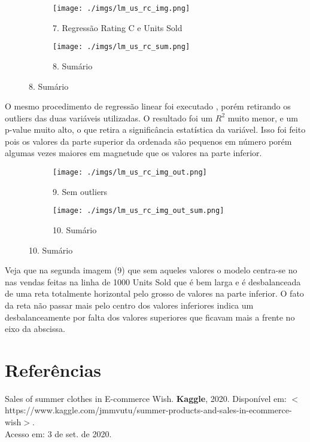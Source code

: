 \documentclass[12pt, a4paper]{article}
\begin{document}
\FloatBarrier
\begin{figure}[h]
	\hspace{1cm}
  \begin{subfigure}[b]{0.4\textwidth}
    \texttt{[image: ./imgs/lm\_us\_rc\_img.png]}
    \caption*{7. Regressão Rating C e Units Sold}
    \label{fig:1}
    \hspace{1.0cm}
  \end{subfigure}
  \begin{subfigure}[b]{0.5\textwidth}
    \texttt{[image: ./imgs/lm\_us\_rc\_sum.png]}
    \caption*{8. Sumário}
    \label{fig:2}
  \end{subfigure}
\end{figure}
\FloatBarrier

O mesmo procedimento de regressão linear foi executado , porém retirando os outliers das duas variáveis utilizadas. O resultado foi um $R^{2}$ muito menor, e um p-value muito alto, o que retira a significância estatística da variável. Isso foi feito pois os valores da parte superior da ordenada são pequenos em número porém algumas vezes maiores em magnetude que os valores na parte inferior.

\FloatBarrier
\begin{figure}[h]
	\hspace{1cm}
  \begin{subfigure}[b]{0.4\textwidth}
    \texttt{[image: ./imgs/lm\_us\_rc\_img\_out.png]}
    \caption*{9. Sem outliers}
    \label{fig:1}
    \hspace{1.0cm}
  \end{subfigure}
  \begin{subfigure}[b]{0.5\textwidth}
    \texttt{[image: ./imgs/lm\_us\_rc\_img\_out\_sum.png]}
    \caption*{10. Sumário}
    \label{fig:2}
  \end{subfigure}
\end{figure}
\FloatBarrier

Veja que na segunda imagem (9) que sem aqueles valores o modelo centra-se no nas vendas feitas na linha de 1000 Units Sold que é bem larga e é desbalanceada de uma reta totalmente horizontal pelo grosso de valores na parte inferior. O fato da reta não passar mais pelo centro dos valores inferiores indica um desbalanceamente por falta dos valores superiores que ficavam mais a frente no eixo da abscissa.


\begin{comment}
\FloatBarrier
\begin{figure}[h]
\texttt{[image: ./imgs/lm\_us\_rc\_img.png]}
\caption*{Figura 3: Regressão Rating C e Units Sold}
\end{figure}
\FloatBarrier 
\end{comment}

\section{Referências}  
       
   	Sales of summer clothes in E-commerce Wish. \textbf{Kaggle}, 2020. Disponível em: $<$https://www.kaggle.\/\/com/jmmvutu/summer-products-and-sales-in-ecommerce-wish$>$.\\Acesso em: 3 de set. de 2020.
\end{document}
